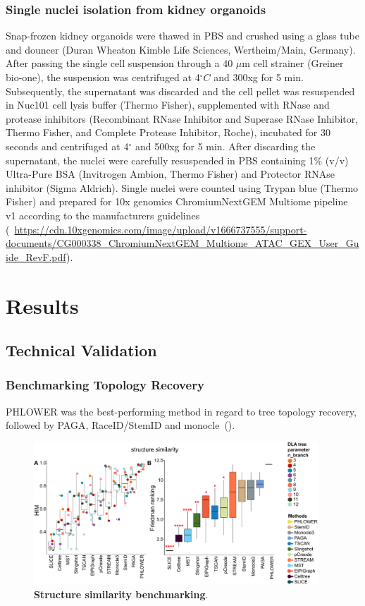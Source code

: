 \subsubsection{Single nuclei isolation from kidney organoids}

Snap-frozen kidney organoids were thawed in PBS and crushed using a glass tube and douncer (Duran Wheaton Kimble Life Sciences, Wertheim/Main, Germany). After passing the single cell suspension through a 40 $\mu$m cell strainer (Greiner bio-one), the suspension was centrifuged at 4$^\circ C$ and 300xg for 5 min. Subsequently, the supernatant was discarded and the cell pellet was resuspended in Nuc101 cell lysis buffer (Thermo Fisher), supplemented with RNase and protease inhibitors (Recombinant RNase Inhibitor and Superase RNase Inhibitor, Thermo Fisher, and Complete Protease Inhibitor, Roche), incubated for 30 seconds and centrifuged at 4$^\circ$ and 500xg for 5 min. After discarding the supernatant, the nuclei were carefully resuspended in PBS containing 1\% (v/v) Ultra-Pure BSA (Invitrogen Ambion, Thermo Fisher) and Protector RNAse inhibitor (Sigma Aldrich). Single nuclei were counted using Trypan blue (Thermo Fisher) and prepared for 10x genomics ChromiumNextGEM Multiome pipeline v1 according to the manufacturers guidelines (~\url{https://cdn.10xgenomics.com/image/upload/v1666737555/support-documents/CG000338_ChromiumNextGEM_Multiome_ATAC_GEX_User_Guide_RevF.pdf}).


\section{Results}
\label{chapter:PHLOWER_bench:out}

\subsection{Technical Validation}
\subsubsection{Benchmarking Topology Recovery}
PHLOWER was the best-performing method in regard to tree topology recovery, followed by PAGA, RaceID/StemID and monocle~(). 
\begin{figure}[!h]
	\centering
	\includegraphics[width=0.95\textwidth]{HIM/fig}
	\vspace{0.1cm}
	\caption[Structure similarity benchmarking]{
	\textbf{Structure similarity benchmarking}.}
	\label{fig:HIM}
\end{figure}


